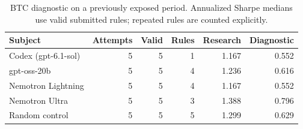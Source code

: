 \begin{table}[tbp]
\centering\small
\setlength{\tabcolsep}{4pt}
\caption{BTC diagnostic on a previously exposed period. Annualized Sharpe medians use valid submitted rules; repeated rules are counted explicitly.}\label{tab:btc}
\begin{tabular}{lrrrrr}
\toprule
Subject & Attempts & Valid & Rules & Research & Diagnostic \\
\midrule
Codex (gpt-6.1-sol) & 5 & 5 & 1 & 1.167 & 0.552 \\
gpt-oss-20b & 5 & 5 & 4 & 1.236 & 0.616 \\
Nemotron Lightning & 5 & 5 & 4 & 1.167 & 0.552 \\
Nemotron Ultra & 5 & 5 & 3 & 1.388 & 0.796 \\
Random control & 5 & 5 & 5 & 1.299 & 0.629 \\
\bottomrule
\end{tabular}
\end{table}
